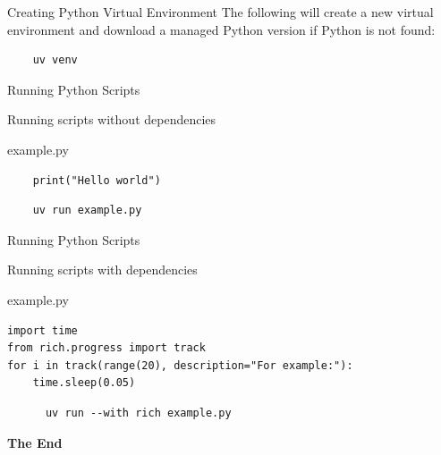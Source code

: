 \documentclass[aspectratio=169,xcolor=dvipsnames,svgnames,x11names,fleqn]{beamer}
\begin{document}
\begin{frame}[containsverbatim]{Creating Python Virtual Environment}
  The following will create a new virtual environment and download a managed Python version if Python is not found:

  \begin{texample}

    \begin{verbatim}
    uv venv
    \end{verbatim}
  \end{texample}
\end{frame}


\begin{frame}[containsverbatim]{Running Python Scripts}
  
  Running scripts without dependencies
  
  \begin{gradblock}{example.py}

    \begin{verbatim}
    print("Hello world")
    \end{verbatim}  
  
  \end{gradblock}

  \begin{texample}

    \begin{verbatim}
    uv run example.py
    \end{verbatim}  
  
  \end{texample}

\end{frame}


\begin{frame}[containsverbatim]{Running Python Scripts}
  
  Running scripts with dependencies
  
  \begin{gradblock}{example.py}

    \begin{verbatim}
import time
from rich.progress import track
for i in track(range(20), description="For example:"):
    time.sleep(0.05)
    \end{verbatim}  
  \end{gradblock}

  \begin{texample}

    \begin{verbatim}
      uv run --with rich example.py
    \end{verbatim}  
  
  \end{texample}

\end{frame}


\begin{frame}
    \Huge{\centerline{\color{bubblegumPink}\textbf{The End}}}
\end{frame}




\end{document}
